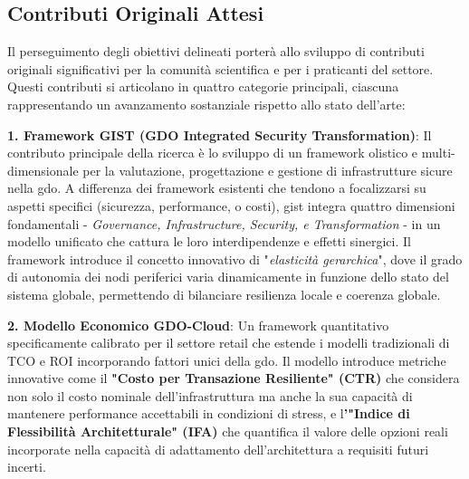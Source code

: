 
\subsection{\texorpdfstring{\textbf{Contributi Originali Attesi}}{1.3.3 - Contributi Originali Attesi}}

\label{ssec:contributi_originali}
Il perseguimento degli obiettivi delineati porterà allo sviluppo di contributi originali significativi per la comunità scientifica e per i praticanti del settore. Questi contributi si articolano in quattro categorie principali, ciascuna rappresentando un avanzamento sostanziale rispetto allo stato dell'arte:

\textbf{1. Framework GIST (GDO Integrated Security Transformation)}: Il contributo principale della ricerca è lo sviluppo di un framework olistico e multi-dimensionale per la valutazione, progettazione e gestione di infrastrutture sicure nella \gls{gdo}. A differenza dei framework esistenti che tendono a focalizzarsi su aspetti specifici (sicurezza, performance, o costi), \gls{gist} integra quattro dimensioni fondamentali - \emph{Governance, Infrastructure, Security, e Transformation} - in un modello unificato che cattura le loro interdipendenze e effetti sinergici. Il framework introduce il concetto innovativo di "\emph{elasticità gerarchica}", dove il grado di autonomia dei nodi periferici varia dinamicamente in funzione dello stato del sistema globale, permettendo di bilanciare resilienza locale e coerenza globale.

\textbf{2. Modello Economico GDO-Cloud}: Un framework quantitativo specificamente calibrato per il settore retail che estende i modelli tradizionali di TCO e ROI incorporando fattori unici della \gls{gdo}. Il modello introduce metriche innovative come il\textbf{ "Costo per Transazione Resiliente" (CTR)} che considera non solo il costo nominale dell'infrastruttura ma anche la sua capacità di mantenere performance accettabili in condizioni di stress, e l\textbf{'"Indice di Flessibilità Architetturale" (IFA)} che quantifica il valore delle opzioni reali incorporate nella capacità di adattamento dell'architettura a requisiti futuri incerti.

